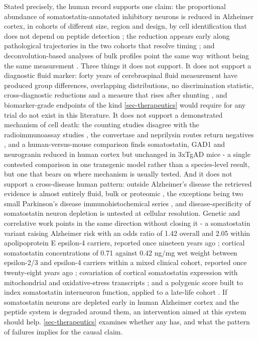 \documentclass[11pt]{article}
\begin{document}
Stated precisely, the human record supports one claim: the proportional abundance of somatostatin-annotated inhibitory neurons is reduced in Alzheimer cortex, in cohorts of different size, region and design, by cell identification that does not depend on peptide detection \citep{Mathys2023,Gabitto2024}; the reduction appears early along pathological trajectories in the two cohorts that resolve timing \citep{Gabitto2024,Travaglini2026}; and deconvolution-based analyses of bulk profiles point the same way without being the same measurement \citep{Cain2023,Consens2022b}. Three things it does not support. It does not support a diagnostic fluid marker: forty years of cerebrospinal fluid measurement have produced group differences, overlapping distributions, no discrimination statistic, cross-diagnostic reductions and a measure that rises after shunting \citep{Beal1986e,Sunderland1987,Molins1991,Poca2001}, and biomarker-grade endpoints of the kind \ref{sec-therapeutics} would require for any trial do not exist in this literature. It does not support a demonstrated mechanism of cell death: the counting studies disagree with the radioimmunoassay studies \citep{Davies1990,Gabriel1993,Nakamura1986}, the convertase and neprilysin routes return negatives \citep{WinskySommerer2003,Gahete2010}, and a human-versus-mouse comparison finds somatostatin, GAD1 and neurogranin reduced in human cortex but unchanged in 3xTgAD mice \citep{Gleichmann2012} - a single contested comparison in one transgenic model rather than a species-level result, but one that bears on where mechanism is usually tested. And it does not support a cross-disease human pattern: outside Alzheimer's disease the retrieved evidence is almost entirely fluid, bulk or proteomic \citep{Dick2024,Dupont1982,Dawbarn1985}, the exceptions being two small Parkinson's disease immunohistochemical series \citep{UbedaBanon2017,FloresCuadrado2017}, and disease-specificity of somatostatin neuron depletion is untested at cellular resolution. Genetic and correlative work points in the same direction without closing it - a somatostatin variant raising Alzheimer risk with an odds ratio of 1.42 overall and 2.05 within apolipoprotein E epsilon-4 carriers, reported once nineteen years ago \citep{Vepsalainen2007}; cortical somatostatin concentrations of 0.71 against 0.42 ng/mg wet weight between epsilon-2/3 and epsilon-4 carriers within a mixed clinical cohort, reported once twenty-eight years ago \citep{Grouselle1998}; covariation of cortical somatostatin expression with mitochondrial and oxidative-stress transcripts \citep{Liu2026}; and a polygenic score built to index somatostatin interneuron function, applied to a late-life cohort \citep{DosSantos2026}. If somatostatin neurons are depleted early in human Alzheimer cortex and the peptide system is degraded around them, an intervention aimed at this system should help. \ref{sec-therapeutics} examines whether any has, and what the pattern of failures implies for the causal claim.
\end{document}
